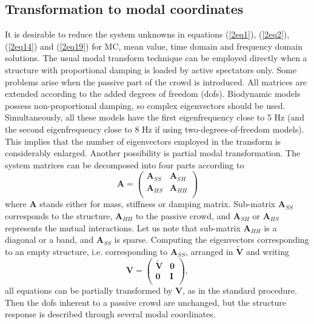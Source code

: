 \documentclass[preprint,12pt,authoryear]{elsarticle}
\newcommand{\bs}[1]{{\boldsymbol{#1}}}
\begin{document}
\subsection{Transformation to modal coordinates}
\label{modalsol}
It is desirable to reduce the system unknowns in equations (\ref{2eq1}), (\ref{2eq2}), (\ref{2eq14}) and (\ref{2eq19}) for MC, mean value, time domain and frequency domain solutions. The usual modal transform technique can be employed directly when a structure with proportional damping is loaded by active spectators only. Some problems arise when the passive part of the crowd is introduced. All matrices are extended according to the added degrees of freedom (dofs). Biodynamic models possess non-proportional damping, so complex eigenvectors should be used. Simultaneously, all these models have the first eigenfrequency close to 5 Hz (and the second eigenfrequency close to 8 Hz if using two-degrees-of-freedom models). This implies that the number of eigenvectors employed in the transform is considerably enlarged. Another possibility is partial modal transformation. The system matrices can be decomposed into four parts according to
\begin{equation}
\bs{A}=\left(\begin{array}{cc}
\bs{A}_{SS} & \bs{A}_{SH} \\
\bs{A}_{HS} & \bs{A}_{HH} \\
\end{array}\right)
\label{modal1}
\end{equation}
where $\bs{A}$ stands either for mass, stiffness or damping matrix. Sub-matrix $\bs{A}_{SS}$ corresponds to the structure, $\bs{A}_{HH}$ to the passive crowd, and $\bs{A}_{SH}$ or $\bs{A}_{HS}$ represents the mutual interactions. Let us note that sub-matrix $\bs{A}_{HH}$ is a diagonal or a band, and $\bs{A}_{SS}$ is sparse. Computing the eigenvectors corresponding to an empty structure, i.e. corresponding to $\bs{A}_{SS}$, arranged in $\bs{\tilde{V}}$ and writing
\begin{equation}
\bs{V}=\left(\begin{array}{cc}
\bs{\tilde{V}} & \bs{0} \\
\bs{0} & \bs{I} \\
\end{array}\right),
\label{modal2}
\end{equation}
all equations can be partially transformed by $\bs{V}$, as in the standard procedure. Then the dofs inherent to a passive crowd are unchanged, but the structure response is described through several modal coordinates.
\end{document}
